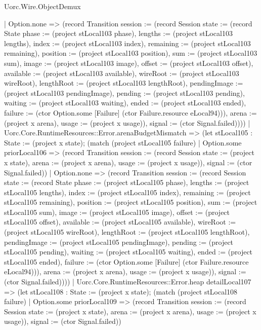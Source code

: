 \begin{lexlean}{Uorc.Wire.ObjectDemux}
\begin{semanticmodule}
{        | Option.none => (record Transition {session := (record Session {state := (record State {phase := (project stLocal103 phase), lengths := (project stLocal103 lengths), index := (project stLocal103 index), remaining := (project stLocal103 remaining), position := (project stLocal103 position), sum := (project stLocal103 sum), image := (project stLocal103 image), offset := (project stLocal103 offset), available := (project stLocal103 available), wireRoot := (project stLocal103 wireRoot), lengthRoot := (project stLocal103 lengthRoot), pendingImage := (project stLocal103 pendingImage), pending := (project stLocal103 pending), waiting := (project stLocal103 waiting), ended := (project stLocal103 ended), failure := (ctor Option.some [Failure] (ctor Failure.resource eLocal94))}), arena := (project x arena), usage := (project x usage)}), signal := (ctor Signal.failed)})))
      | Uorc.Core.RuntimeResources::Error.arenaBudgetMismatch => (let stLocal105 : State := (project x state); (match (project stLocal105 failure)
        | Option.some priorLocal106 => (record Transition {session := (record Session {state := (project x state), arena := (project x arena), usage := (project x usage)}), signal := (ctor Signal.failed)})
        | Option.none => (record Transition {session := (record Session {state := (record State {phase := (project stLocal105 phase), lengths := (project stLocal105 lengths), index := (project stLocal105 index), remaining := (project stLocal105 remaining), position := (project stLocal105 position), sum := (project stLocal105 sum), image := (project stLocal105 image), offset := (project stLocal105 offset), available := (project stLocal105 available), wireRoot := (project stLocal105 wireRoot), lengthRoot := (project stLocal105 lengthRoot), pendingImage := (project stLocal105 pendingImage), pending := (project stLocal105 pending), waiting := (project stLocal105 waiting), ended := (project stLocal105 ended), failure := (ctor Option.some [Failure] (ctor Failure.resource eLocal94))}), arena := (project x arena), usage := (project x usage)}), signal := (ctor Signal.failed)})))
      | Uorc.Core.RuntimeResources::Error.heap detailLocal107 => (let stLocal108 : State := (project x state); (match (project stLocal108 failure)
        | Option.some priorLocal109 => (record Transition {session := (record Session {state := (project x state), arena := (project x arena), usage := (project x usage)}), signal := (ctor Signal.failed)})
}
\end{semanticmodule}
\end{lexlean}
